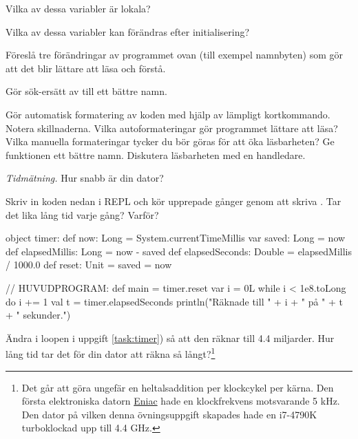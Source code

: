\Subtask\Pen Vilka av dessa variabler är lokala?

\Subtask\Pen Vilka av dessa variabler kan förändras efter initialisering?

\Subtask\Pen Föreslå tre förändringar av programmet ovan (till exempel namnbyten) som gör att det blir lättare att läsa och förstå.

\Subtask Gör sök-ersätt av  till ett bättre namn. %

\Subtask Gör automatisk formatering av koden med hjälp av lämpligt kortkommando. Notera skillnaderna. Vilka autoformateringar gör programmet lättare att läsa? Vilka manuella formateringar tycker du bör göras för att öka läsbarheten? Ge funktionen  ett bättre namn.  Diskutera läsbarheten med en handledare.



\Task \label{task:measuretime} \emph{Tidmätning.} Hur snabb är din dator?

\Subtask \label{task:timer} Skriv in koden nedan i REPL och kör upprepade gånger genom att skriva . Tar det lika lång tid varje gång? Varför?

\begin{Code}
object timer:
  def now: Long = System.currentTimeMillis
  var saved: Long = now
  def elapsedMillis: Long = now - saved
  def elapsedSeconds: Double = elapsedMillis / 1000.0
  def reset: Unit =
    saved = now

// HUVUDPROGRAM:
def main =
  timer.reset
  var i = 0L
  while i < 1e8.toLong do
    i += 1
  val t = timer.elapsedSeconds
  println("Räknade till " + i + " på " + t + " sekunder.")
\end{Code}


\Subtask Ändra i loopen i uppgift \ref{task:timer}) så att den räknar till 4.4 miljarder. Hur lång tid tar det för din dator att räkna så långt?\footnote{Det går att göra ungefär en heltalsaddition per klockcykel per kärna. Den första elektroniska datorn \href{https://sv.wikipedia.org/wiki/ENIAC}{Eniac} hade en klockfrekvens motsvarande 5 kHz. Den dator på vilken denna övningsuppgift skapades hade en i7-4790K turboklockad upp till 4.4 GHz.
}

